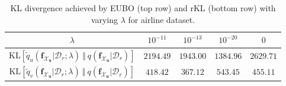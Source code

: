 \documentclass{article}
\theoremstyle{definition}
\newcommand{\mbf}[1]{\mathbf{#1}}
\newcommand{\mcl}[1]{\mathcal{#1}}
\newcommand{\dc}{\mcl{D}_r}
\newcommand{\dr}{\mcl{D}_e}
\newcommand{\eubo}{\tilde{q}_u}
\newcommand{\elbo}{\tilde{q}_v}
\begin{document}
%
\begin{table}
\centering
\caption{KL divergence achieved by EUBO (top row) and rKL (bottom row)
with varying $\lambda$ for airline dataset.}
\begin{tabular}{ccccc}
\toprule
$\lambda$ &  $10^{-11}$ & $10^{-13}$ & $10^{-20}$ & $0$\\
\midrule
$\text{KL}[\eubo(\mbf{f}_{\mcl{X}_\mbf{u}}| \mcl{D}_r; \lambda)\ \Vert\ q(\mbf{f}_{\mcl{X}_\mbf{u}}| \mcl{D}_r)]$
& $2194.49$ & $1943.00$ & $1384.96$ & $2629.71$
\\
$\text{KL}[\elbo(\mbf{f}_{\mcl{X}_\mbf{u}}| \mcl{D}_r; \lambda)\ \Vert\ q(\mbf{f}_{\mcl{X}_\mbf{u}}| \mcl{D}_r)]$
& $418.42$ & $367.12$ & $543.45$ & $455.11$ \\
\bottomrule
\end{tabular}
\label{tbl:airlineresult}
\end{table}
%
%
\end{document}
